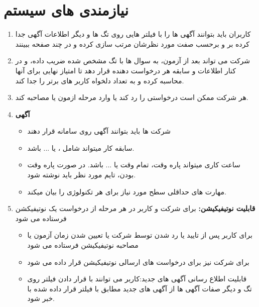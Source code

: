 \documentclass{article}
\begin{document}
\section{نیازمندی های سیستم}
    \begin{enumerate}[\hspace{1cm}1.]
        \item کاربران باید بتوانند آگهی ها را با فیلتر هایی روی تگ ها و دیگر اطلاعات آگهی جدا کرده بر و برحسب صفت مورد نظرشان مرتب سازی کرده و در چند صفحه ببینند
        
        \item شرکت می تواند بعد از آزمون، به سوال ها با تگ مشخص شده ضریب داده، و در کنار اطلاعات و سابقه هر درخواست دهنده قرار دهد تا امتیاز نهایی برای آنها محاسبه کرده و به تعداد دلخواه کاربر های برتر را جدا کند.
        \item هر شرکت ممکن است درخواستی را رد کند یا وارد مرحله ازمون یا مصاحبه کند.
        
        \item \textbf{آگهی}
        \begin{itemize}
            \item شرکت ها باید بتوانند آگهی روی سامانه قرار دهند 
            \item سابقه کار میتواند شامل ،  یا ... باشد.
            \item ساعت کاری میتواند پاره وقت، تمام وقت یا ... باشد. در صورت پاره وقت بودن، تایم مورد نظر باید نوشته شود.
            \item مهارت های حداقلی سطح مورد نیاز برای هر تکنولوژی را بیان میکند.
        \end{itemize}

        \item \textbf{ قابلیت نوتیفیکیشن:} برای شرکت و کاربر در هر مرحله از درخواست یک نوتیفیکشن فرستاده می شود
        \begin{itemize}
            \item برای کاربر پس از تایید یا رد شدن توسط شرکت یا تعیین شدن زمان آزمون یا مصاحبه نوتیفیکیشن فرستاده می شود
            \item برای شرکت نیز برای درخواست های ارسالی نوتیفیکیشن قرار داده می شود
            \item قابلیت اطلاع رسانی آگهی های جدید:کاربر می توانند با قرار دادن فیلتر روی تگ و دیگر صفات آگهی ها
            از آگهی های جدید مطابق با فیلتر قرار داده شده با خبر شود.
        \end{itemize}

        \pagebreak


\end{enumerate}
\end{document}
